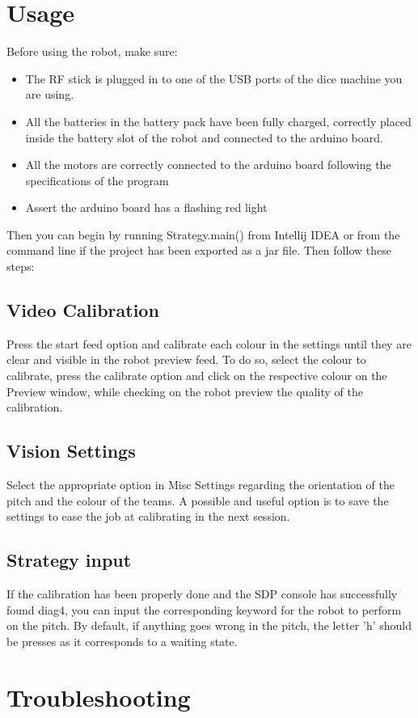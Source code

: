 \documentclass[10pt]{article}
\begin{document}
\section{Usage}
Before using the robot, make sure:
\begin{itemize}
  \item The RF stick is plugged in to one of the USB ports of the dice machine you are using.
  \item All the batteries in the battery pack have been fully charged, correctly placed inside the battery slot of the robot and connected to the arduino board.
  \item All the motors are correctly connected to the arduino board following the specifications of the program
  \item Assert the arduino board has a flashing red light
\end{itemize}

Then you can begin by running Strategy.main() from Intellij IDEA or from the command line if the project has been exported as a jar file. Then follow these steps:
\subsection{Video Calibration}
Press the start feed option and calibrate each colour in the settings until they are clear and visible in the robot preview feed. To do so, select the colour to calibrate, press the calibrate option and click on the respective colour on the Preview window, while checking on the robot preview the quality of the calibration.
\subsection{Vision Settings}
Select the appropriate option in Misc Settings regarding the orientation of the pitch and the colour of the teams. A possible and useful option is to save the settings to ease the job at calibrating in the next session. 
\subsection{Strategy input}
If the calibration has been properly done and the SDP console has successfully found diag4, you can input the corresponding keyword for the robot to perform on the pitch. By default, if anything goes wrong in the pitch, the letter 'h' should be presses as it corresponds to a waiting state.
\section{Troubleshooting}
\end{document}
